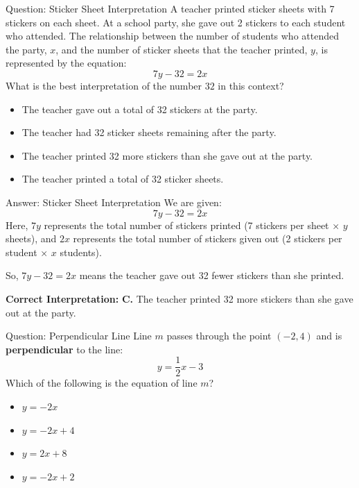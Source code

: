 \documentclass{beamer}
\begin{document}
\begin{frame}{Question: Sticker Sheet Interpretation}
A teacher printed sticker sheets with 7 stickers on each sheet. At a school party, she gave out 2 stickers to each student who attended. The relationship between the number of students who attended the party, \(x\), and the number of sticker sheets that the teacher printed, \(y\), is represented by the equation:
\[
7y - 32 = 2x
\]
What is the best interpretation of the number \(32\) in this context?

\vspace{1em}
\begin{itemize}
    \item[\textbf{A.}] The teacher gave out a total of 32 stickers at the party.
    \item[\textbf{B.}] The teacher had 32 sticker sheets remaining after the party.
    \item[\textbf{C.}] The teacher printed 32 more stickers than she gave out at the party.
    \item[\textbf{D.}] The teacher printed a total of 32 sticker sheets.
\end{itemize}
\end{frame}
\begin{frame}{Answer: Sticker Sheet Interpretation}
We are given:
\[
7y - 32 = 2x
\]
Here, \(7y\) represents the total number of stickers printed (7 stickers per sheet × \(y\) sheets),  
and \(2x\) represents the total number of stickers given out (2 stickers per student × \(x\) students).

So, \(7y - 32 = 2x\) means the teacher gave out 32 fewer stickers than she printed.

\vspace{1em}
\textbf{Correct Interpretation:}  
\textbf{C.} The teacher printed 32 more stickers than she gave out at the party.
\end{frame}

\begin{frame}{Question: Perpendicular Line}
Line \( m \) passes through the point \( (-2, 4) \) and is \textbf{perpendicular} to the line:
\[
y = \frac{1}{2}x - 3
\]
Which of the following is the equation of line \( m \)?
\begin{itemize}
    \item[\textbf{A.}] \( y = -2x \)
    \item[\textbf{B.}] \( y = -2x + 4 \)
    \item[\textbf{C.}] \( y = 2x + 8 \)
    \item[\textbf{D.}] \( y = -2x + 2 \)
\end{itemize}
\end{frame}
\end{document}
